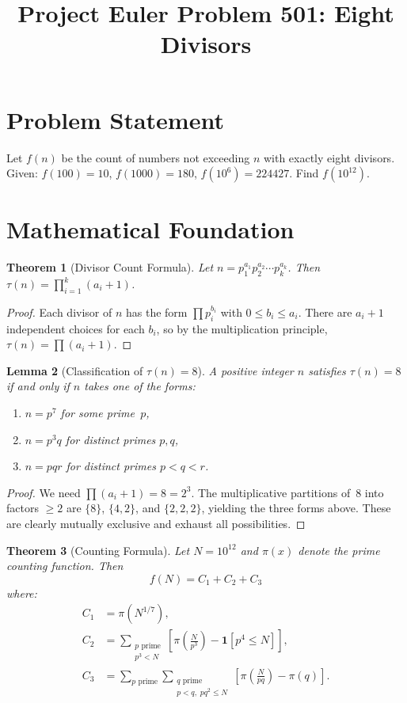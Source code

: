 \documentclass[12pt]{article}
\title{Project Euler Problem 501: Eight Divisors}
\author{}
\date{}
\newtheorem{theorem}{Theorem}
\newtheorem{lemma}[theorem]{Lemma}
\begin{document}
\maketitle

\section{Problem Statement}
Let $f(n)$ be the count of numbers not exceeding $n$ with exactly eight divisors.
Given: $f(100) = 10$, $f(1000) = 180$, $f(10^6) = 224427$. Find $f(10^{12})$.

\section{Mathematical Foundation}

\begin{theorem}[Divisor Count Formula]
Let $n = p_1^{a_1} p_2^{a_2} \cdots p_k^{a_k}$. Then $\tau(n) = \prod_{i=1}^{k}(a_i + 1)$.
\end{theorem}

\begin{proof}
Each divisor of $n$ has the form $\prod p_i^{b_i}$ with $0 \le b_i \le a_i$. There are $a_i + 1$ independent choices for each $b_i$, so by the multiplication principle, $\tau(n) = \prod(a_i + 1)$.
\end{proof}

\begin{lemma}[Classification of $\tau(n) = 8$]
A positive integer $n$ satisfies $\tau(n) = 8$ if and only if $n$ takes one of the forms:
\begin{enumerate}
    \item $n = p^7$ for some prime~$p$,
    \item $n = p^3 q$ for distinct primes $p, q$,
    \item $n = pqr$ for distinct primes $p < q < r$.
\end{enumerate}
\end{lemma}

\begin{proof}
We need $\prod(a_i + 1) = 8 = 2^3$. The multiplicative partitions of~8 into factors $\ge 2$ are $\{8\}$, $\{4, 2\}$, and $\{2, 2, 2\}$, yielding the three forms above. These are clearly mutually exclusive and exhaust all possibilities.
\end{proof}

\begin{theorem}[Counting Formula]
Let $N = 10^{12}$ and $\pi(x)$ denote the prime counting function. Then
\[
f(N) = C_1 + C_2 + C_3
\]
where:
\begin{align}
C_1 &= \pi(N^{1/7}), \\
C_2 &= \sum_{\substack{p \text{ prime} \\ p^3 < N}} \left[\pi\!\left(\frac{N}{p^3}\right) - \mathbf{1}[p^4 \le N]\right], \\
C_3 &= \sum_{p \text{ prime}} \sum_{\substack{q \text{ prime} \\ p < q,\; pq^2 \le N}} \left[\pi\!\left(\frac{N}{pq}\right) - \pi(q)\right].
\end{align}
\end{theorem}
\end{document}
